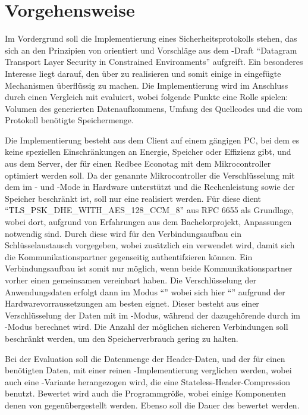 \section{Vorgehensweise}

Im Vordergrund soll die Implementierung eines Sicherheitsprotokolls stehen, das sich an den Prinzipien von  orientiert
und Vorschläge aus dem -Draft "`Datagram Transport Layer Security in Constrained Environments"' \cite{draftcodtls} aufgreift.
Ein besonderes Interesse liegt darauf, den  über  \cite{draftcoap13} zu realisieren und somit einige in  eingefügte
Mechanismen überflüssig zu machen. Die Implementierung wird im Anschluss durch einen Vergleich mit  evaluiert, wobei folgende Punkte eine
Rolle spielen: Volumen des generierten Datenaufkommens, Umfang des Quellcodes und die vom Protokoll benötigte Speichermenge.

Die Implementierung besteht aus dem Client auf einem gängigen PC, bei dem es keine speziellen Einschränkungen an Energie,
Speicher oder Effizienz gibt, und aus dem Server, der für einen Redbee Econotag \cite{econotag} mit dem  \cite{mc1322}
Mikrocontroller optimiert werden soll. Da der genannte Mikrocontroller die Verschlüsselung mit dem  im - und -Mode
in Hardware unterstützt und die Rechenleistung sowie der Speicher beschränkt ist, soll nur eine  realisiert werden.
Für diese dient "`TLS\_PSK\_DHE\_WITH\_AES\_128\_CCM\_8"' aus RFC 6655 \cite{rfc6655} als Grundlage, wobei dort, aufgrund von Erfahrungen
aus dem Bachelorprojekt, Anpassungen notwendig sind. Durch diese wird für den Verbindungsaufbau ein Schlüsselaustausch vorgegeben, wobei zusätzlich
ein  verwendet wird, damit sich die Kommunikationspartner gegenseitig authentifzieren können. Ein Verbindungsaufbau ist somit nur möglich,
wenn beide Kommunikationspartner vorher einen gemeinsamen  vereinbart haben. Die Verschlüsselung der Anwendungsdaten erfolgt dann im Modus
"`"' \cite{rfc5116} wobei sich hier "`"' \cite{rfc3610} aufgrund der Hardwarevorraussetzungen am besten eignet. Dieser besteht
aus einer Verschlüsselung der Daten mit  im -Modus, während der dazugehörende  durch  im -Modus
berechnet wird. Die Anzahl der möglichen sicheren Verbindungen soll beschränkt werden, um den Speicherverbrauch gering zu halten.

Bei der Evaluation soll die Datenmenge der Header-Daten, und der für einen  benötigten Daten, mit einer reinen -Implementierung
verglichen werden, wobei auch eine -Variante herangezogen wird, die eine Stateless-Header-Compression benutzt. Bewertet wird auch die Programmgröße,
wobei einige Komponenten denen von  gegenübergestellt werden. Ebenso soll die Dauer des  bewertet werden.